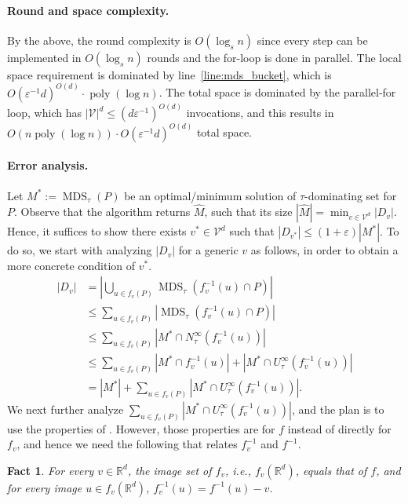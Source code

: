 \documentclass[11pt,letterpaper]{article}
\theoremstyle{plain}
\newtheorem{fact}[theorem]{Fact}
\theoremstyle{definition}
\theoremstyle{remark}
\DeclareMathOperator{\poly}{poly}
\DeclareMathOperator{\MDS}{MDS}
\renewcommand{\epsilon}{\ensuremath{\varepsilon}}
\let\epsilon\varepsilon
\begin{document}
\paragraph{Round and space complexity.}
By the above, the round complexity is $O(\log_s n)$ since every step can be implemented in $O(\log_s n)$ rounds and the for-loop is done in parallel.
The local space requirement is dominated by line~\ref{line:mds_bucket},
which is $O(\varepsilon^{-1}d)^{O(d)}\cdot \poly(\log n)$.
The total space is dominated by the parallel-for loop,
which has $|\mathcal{V}|^d \leq (d\epsilon^{-1})^{O(d)}$ invocations,
and this results in $O(n \poly(\log n)) \cdot O(\varepsilon^{-1}d)^{O(d)}$ total space.

\paragraph{Error analysis.}
Let $M^* := \MDS_\tau(P)$ be an optimal/minimum solution of $\tau$-dominating set for $P$.
Observe that the algorithm returns $\widehat{M}$,
such that its size $|\widehat{M}| = \min_{v \in \mathcal{V}^d} |D_v|$.
Hence, it suffices to show there exists $v^* \in \mathcal{V}^d$ such that $|D_{v^*}| \leq (1 + \epsilon) |M^*|$.
To do so, we start with analyzing $|D_v|$ for a generic $v$ as follows,
in order to obtain a more concrete condition of $v^*$.
\begin{align}
    |D_v|
    &= \left|\bigcup_{u\in f_{v}(P)} \MDS_{\tau}(f_{v}^{-1}(u)\cap P)\right| \nonumber \\
    &\leq \sum_{u \in f_v(P)} |\MDS_\tau(f_v^{-1}(u) \cap P)| \nonumber \\
    &\leq \sum_{u \in f_v(P)} |M^* \cap N_\tau^\infty(f_v^{-1}(u))| \nonumber \\
    &\leq \sum_{u \in f_v(P)} |M^* \cap f_v^{-1}(u)| + |M^* \cap U_\tau^\infty(f_v^{-1}(u))| \nonumber \\
    &= |M^*| + \sum_{u \in f_v(P)} |M^* \cap U_\tau^\infty(f_v^{-1}(u))|. \label{eqn:DvtoMstar}
\end{align}
We next further analyze $\sum_{u \in f_v(P)} |M^* \cap U_\tau^\infty(f_v^{-1}(u))|$,
and the plan is to use the properties of .
However, those properties are for $f$ instead of directly for $f_v$, and hence we need the following  that relates $f_v^{-1}$ and $f^{-1}$.
\begin{fact}
    \label{fact:f_fv}
    For every $v \in \mathbb{R}^d$, 
    the image set of $f_v$, i.e., $f_v(\mathbb{R}^d)$, equals that of $f$,
    and for every image $u \in f_v(\mathbb{R}^d)$, $f_v^{-1}(u) = f^{-1}(u) - v$.
\end{fact}
\end{document}

